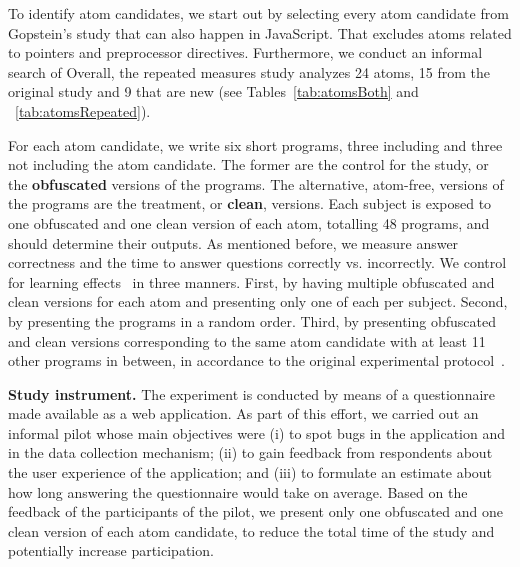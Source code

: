 To identify atom candidates, we start out by selecting every atom candidate from Gopstein's study that can also happen in JavaScript. That excludes atoms related to pointers and preprocessor directives. Furthermore, we conduct an informal search of  Overall, the repeated measures study analyzes 24 atoms, 15 from the original study and 9 that are new (see Tables~\ref{tab:atomsBoth} and ~\ref{tab:atomsRepeated}). 

For each atom candidate, we write six short programs, three including and three not including the atom candidate. The former are the control for the study, or the \textbf{obfuscated} versions of the programs. The alternative, atom-free, versions of the programs are the treatment, or \textbf{clean}, versions. Each subject is exposed to one obfuscated and one clean version of each atom, totalling 48 programs, and should determine their outputs. As mentioned before, we measure answer correctness and the time to answer questions correctly vs. incorrectly. We control for learning effects~\cite{Neely:1991:SPE} in three manners. First, by having multiple obfuscated and clean versions for each atom and presenting only one of each per subject. Second, by presenting the programs in a random order. Third, by presenting obfuscated and clean versions corresponding to the same atom candidate with at least 11 other programs in between, in  accordance to the original experimental protocol~\cite{DBLP:conf/sigsoft/GopsteinIYDZYC17}. 


{\bf Study instrument.} The experiment is conducted by means of a questionnaire made available as a web application. As part of this effort, we carried out an informal pilot whose main objectives were (i) to spot bugs in the application and in the data collection mechanism; (ii) to gain feedback from respondents about the user experience of the application; and (iii) to formulate an estimate about how long answering the questionnaire would take on average. Based on the feedback of the participants of the pilot, we present only one obfuscated and one clean version of each atom candidate, to reduce the total time of the study and potentially increase participation.%

